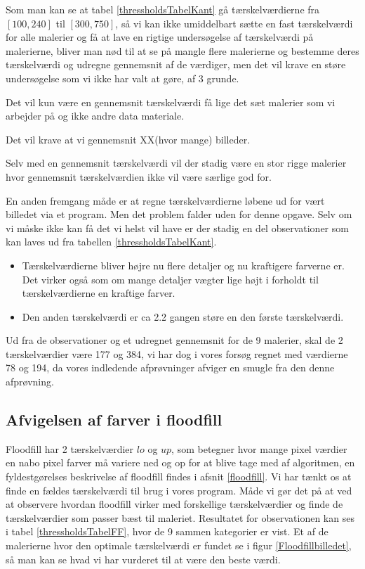 Som man kan se at tabel \ref{thressholdsTabelKant} gå tærskelværdierne
fra $[100,240]$ til $[300,750]$, så vi kan ikke umiddelbart sætte en
fast tærskelværdi for alle malerier og få at lave en rigtige
undersøgelse af tærskelværdi på malerierne, bliver man nød til at se på
mangle flere malerierne  og bestemme deres tærskelværdi og
udregne gennemsnit af de værdiger, men det vil krave en støre
undersøgelse som vi ikke har valt at gøre, af 3 grunde.

\begin{enumeret}
	\item Det vil kun være en gennemsnit tærskelværdi få lige det sæt
	malerier som vi arbejder på og ikke andre data materiale.
	\item Det vil krave at vi gennemsnit XX(hvor mange) billeder. 
	\item Selv med en gennemsnit tærskelværdi vil der stadig være en stor
	rigge malerier hvor gennemsnit tærskelværdien ikke vil
være særlige god for. 
\end{enumeret}

En anden fremgang måde er at regne tærskelværdierne løbene ud for vært
billedet via et program. Men det problem falder uden for denne opgave.
Selv om vi måske ikke kan få det vi helst vil have er der stadig en del
observationer som kan laves ud fra tabellen \ref{thressholdsTabelKant}. 

\begin{itemize}
	\item Tærskelværdierne bliver højre nu flere detaljer og nu
	kraftigere farverne er. Det virker også som om mange detaljer vægter
	lige højt i forholdt til tærskelværdierne en kraftige farver. 
	\item Den anden tærskelværdi er ca 2.2 gangen støre en den første
	tærskelværdi.
\end{itemize}

Ud fra de observationer og et udregnet gennemsnit for de 9 malerier,
skal de 2 tærskelværdier være 177 og 384, vi har dog i vores forsøg
regnet med værdierne 78 og 194, da vores indledende afprøvninger afviger
en smugle fra den denne afprøvning.

\subsection{Afvigelsen af farver i floodfill}
Floodfill har 2 tærskelværdier $lo$ og $up$, som betegner hvor mange
pixel værdier en nabo pixel farver må variere ned og op for at blive tage med af algoritmen, en
fyldestgørelses beskrivelse af floodfill findes i afsnit
\ref{floodfill}. Vi har tænkt os at finde en fældes tærskelværdi til
brug i vores program. Måde vi gør det på at ved at observere hvordan
floodfill virker med forskellige tærskelværdier og finde de
tærskelværdier som passer bæst til maleriet. Resultatet for
observationen kan ses i tabel \ref{thressholdsTabelFF}, hvor de 9 sammen
kategorier er vist. Et af de malerierne hvor den optimale tærskelværdi
er fundet se i figur \ref{Floodfillbilledet}, så man kan se hvad vi har
vurderet til at være den beste værdi.

